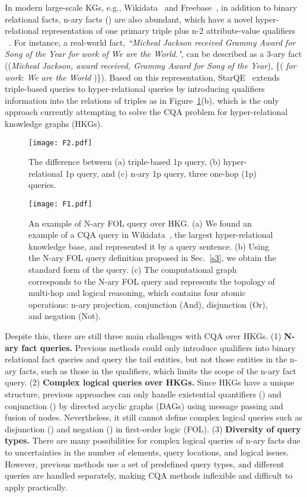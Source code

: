 \documentclass[letterpaper]{article} \usepackage{aaai23}  \usepackage{times}  \usepackage{helvet}  \usepackage{courier}  \usepackage[hyphens]{url}  \usepackage{graphicx} \urlstyle{rm} \def\UrlFont{\rm}  \usepackage{natbib}  \usepackage{caption} \frenchspacing  \setlength{\pdfpagewidth}{8.5in}  \setlength{\pdfpageheight}{11in}  \usepackage{algorithm}
\begin{document}
In modern large-scale KGs, e.g., Wikidata~\citep{Wikidata} and Freebase~\citep{Freebase}, in addition to binary relational facts, n-ary facts () are also abundant, which have a novel hyper-relational representation of one primary triple plus n-2 attribute-value qualifiers ~\citep{HINGE}. For instance, a real-world fact, \textit{``Micheal Jackson received Grammy Award for Song of the Year for work of We are the World."}, can be described as a 3-ary fact ((\textit{Micheal Jackson, award received, Grammy Award for Song of the Year}), \{( \textit{for work}: \textit{We are the World} )\}). Based on this representation, StarQE~\citep{StarQE} extends triple-based queries to hyper-relational queries by introducing qualifiers information into the relations of triples as in Figure~\ref{f2}(b), which is the only approach currently attempting to solve the CQA problem for hyper-relational knowledge graphs (HKGs).

\begin{figure}[t]
\centering
\texttt{[image: F2.pdf]}
\caption{The difference between (a) triple-based 1p query, (b) hyper-relational 1p query, and (c) n-ary 1p query, three one-hop (1p) queries.}
\label{f2}
\end{figure}

\begin{figure*}[h!t]
\centering
\texttt{[image: F1.pdf]}
\caption{An example of N-ary FOL query over HKG. (a) We found an example of a CQA query in Wikidata~\citep{Wikidata}, the largest hyper-relational knowledge base, and represented it by a query sentence. (b) Using the N-ary FOL query definition proposed in Sec.~\ref{s3}, we obtain the standard form of the query. (c) The computational graph corresponds to the N-ary FOL query and represents the topology of multi-hop and logical reasoning, which contains four atomic operations: n-ary projection, conjunction (And), disjunction (Or), and negation (Not).}
\label{f1}
\end{figure*}

Despite this, there are still three main challenges with CQA over HKGs. (1) \textbf{N-ary fact queries.} Previous methods could only introduce qualifiers into binary relational fact queries and query the tail entities, but not those entities in the n-ary facts, such as those in the qualifiers, which limits the scope of the n-ary fact query. (2) \textbf{Complex logical queries over HKGs.} Since HKGs have a unique structure, previous approaches can only handle existential quantifiers () and conjunction () by directed acyclic graphs (DAGs) using message passing and fusion of nodes. Nevertheless, it still cannot define complex logical queries such as disjunction () and negation () in first-order logic (FOL). (3) \textbf {Diversity of query types.} There are many possibilities for complex logical queries of n-ary facts due to uncertainties in the number of elements, query locations, and logical issues. However, previous methods use a set of predefined query types, and different queries are handled separately, making CQA methods inflexible and difficult to apply practically.
\end{document}
